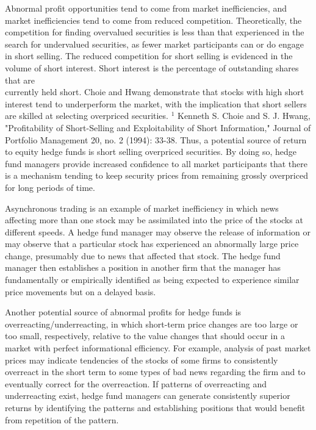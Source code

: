 \documentclass[11pt]{article}
\begin{document}
Abnormal profit opportunities tend to come from market inefficiencies, and market inefficiencies tend to come from reduced competition. Theoretically, the competition for finding overvalued securities is less than that experienced in the search for undervalued securities, as fewer market participants can or do engage in short selling. The reduced competition for short selling is evidenced in the volume of short interest. Short interest is the percentage of outstanding shares that are\\
currently held short. Choie and Hwang demonstrate that stocks with high short interest tend to underperform the market, with the implication that short sellers are skilled at selecting overpriced securities. ${ }^{1}$ Kenneth S. Choie and S. J. Hwang, "Profitability of Short-Selling and Exploitability of Short Information," Journal of Portfolio Management 20, no. 2 (1994): 33-38. Thus, a potential source of return to equity hedge funds is short selling overpriced securities. By doing so, hedge fund managers provide increased confidence to all market participants that there is a mechanism tending to keep security prices from remaining grossly overpriced for long periods of time.

Asynchronous trading is an example of market inefficiency in which news affecting more than one stock may be assimilated into the price of the stocks at different speeds. A hedge fund manager may observe the release of information or may observe that a particular stock has experienced an abnormally large price change, presumably due to news that affected that stock. The hedge fund manager then establishes a position in another firm that the manager has fundamentally or empirically identified as being expected to experience similar price movements but on a delayed basis.

Another potential source of abnormal profits for hedge funds is overreacting/underreacting, in which short-term price changes are too large or too small, respectively, relative to the value changes that should occur in a market with perfect informational efficiency. For example, analysis of past market prices may indicate tendencies of the stocks of some firms to consistently overreact in the short term to some types of bad news regarding the firm and to eventually correct for the overreaction. If patterns of overreacting and underreacting exist, hedge fund managers can generate consistently superior returns by identifying the patterns and establishing positions that would benefit from repetition of the pattern.
\end{document}
